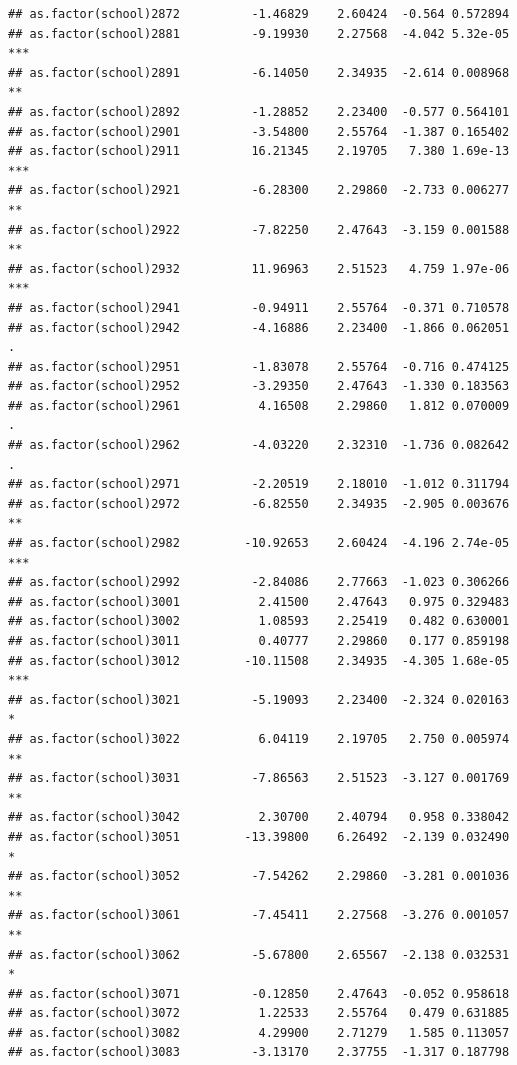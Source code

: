 \documentclass[ignorenonframetext,]{beamer}
\begin{document}
\begin{frame}[fragile]{}
\begin{verbatim}
## as.factor(school)2872          -1.46829    2.60424  -0.564 0.572894    
## as.factor(school)2881          -9.19930    2.27568  -4.042 5.32e-05 ***
## as.factor(school)2891          -6.14050    2.34935  -2.614 0.008968 ** 
## as.factor(school)2892          -1.28852    2.23400  -0.577 0.564101    
## as.factor(school)2901          -3.54800    2.55764  -1.387 0.165402    
## as.factor(school)2911          16.21345    2.19705   7.380 1.69e-13 ***
## as.factor(school)2921          -6.28300    2.29860  -2.733 0.006277 ** 
## as.factor(school)2922          -7.82250    2.47643  -3.159 0.001588 ** 
## as.factor(school)2932          11.96963    2.51523   4.759 1.97e-06 ***
## as.factor(school)2941          -0.94911    2.55764  -0.371 0.710578    
## as.factor(school)2942          -4.16886    2.23400  -1.866 0.062051 .  
## as.factor(school)2951          -1.83078    2.55764  -0.716 0.474125    
## as.factor(school)2952          -3.29350    2.47643  -1.330 0.183563    
## as.factor(school)2961           4.16508    2.29860   1.812 0.070009 .  
## as.factor(school)2962          -4.03220    2.32310  -1.736 0.082642 .  
## as.factor(school)2971          -2.20519    2.18010  -1.012 0.311794    
## as.factor(school)2972          -6.82550    2.34935  -2.905 0.003676 ** 
## as.factor(school)2982         -10.92653    2.60424  -4.196 2.74e-05 ***
## as.factor(school)2992          -2.84086    2.77663  -1.023 0.306266    
## as.factor(school)3001           2.41500    2.47643   0.975 0.329483    
## as.factor(school)3002           1.08593    2.25419   0.482 0.630001    
## as.factor(school)3011           0.40777    2.29860   0.177 0.859198    
## as.factor(school)3012         -10.11508    2.34935  -4.305 1.68e-05 ***
## as.factor(school)3021          -5.19093    2.23400  -2.324 0.020163 *  
## as.factor(school)3022           6.04119    2.19705   2.750 0.005974 ** 
## as.factor(school)3031          -7.86563    2.51523  -3.127 0.001769 ** 
## as.factor(school)3042           2.30700    2.40794   0.958 0.338042    
## as.factor(school)3051         -13.39800    6.26492  -2.139 0.032490 *  
## as.factor(school)3052          -7.54262    2.29860  -3.281 0.001036 ** 
## as.factor(school)3061          -7.45411    2.27568  -3.276 0.001057 ** 
## as.factor(school)3062          -5.67800    2.65567  -2.138 0.032531 *  
## as.factor(school)3071          -0.12850    2.47643  -0.052 0.958618    
## as.factor(school)3072           1.22533    2.55764   0.479 0.631885    
## as.factor(school)3082           4.29900    2.71279   1.585 0.113057    
## as.factor(school)3083          -3.13170    2.37755  -1.317 0.187798    

\end{verbatim}
\end{frame}
\end{document}
